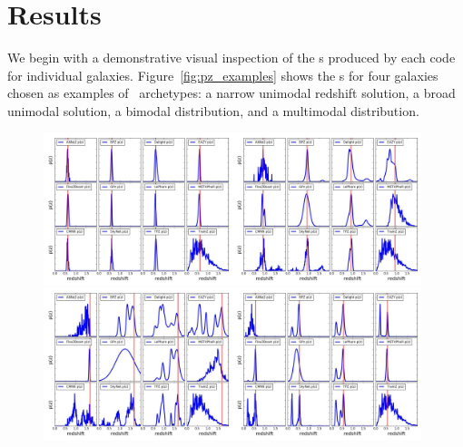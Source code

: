 \section{Results}
\label{sec:results}

We begin with a demonstrative visual inspection of the \pzpdf s produced by each code for individual galaxies.
Figure~\ref{fig:pz_examples} shows the \pzpdf s for four galaxies chosen as examples of \pzpdf\ archetypes: a narrow unimodal redshift solution, a broad unimodal solution, a bimodal distribution, and a multimodal distribution.

\begin{figure}
\includegraphics[width=0.49\textwidth]{fig/pz_12codes_261931_noseaborn_crop.jpg}\includegraphics[width=0.49\textwidth]{fig/pz_12codes_471167_noseaborn_crop.jpg}\\
\includegraphics[width=0.49\textwidth]{fig/pz_12codes_713178_noseaborn_crop.jpg}\includegraphics[width=0.49\textwidth]{fig/pz_12codes_982747_noseaborn_crop.jpg}

\end{figure}

